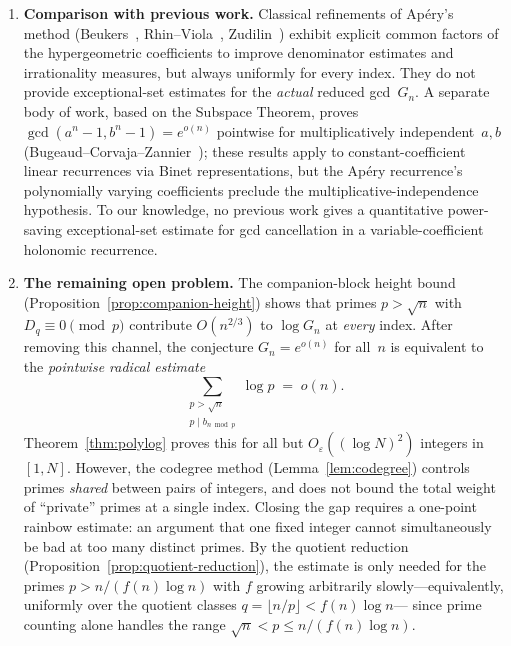 \documentclass[11pt]{article}
\theoremstyle{definition}
\theoremstyle{remark}
\begin{document}
\begin{enumerate}
\item \textbf{Comparison with previous work.}\label{rem:literature}
      Classical refinements of Ap\'ery's method
      (Beukers~\cite{Beukers1985},
      Rhin--Viola~\cite{RhinViola2001},
      Zudilin~\cite{Zudilin2004})
      exhibit explicit common factors
      of the hypergeometric coefficients
      to improve denominator estimates
      and irrationality measures,
      but always uniformly for every index.
      They do not provide exceptional-set
      estimates for the \emph{actual}
      reduced gcd~$G_n$.
      A separate body of work, based on the
      Subspace Theorem, proves
      $\gcd(a^n - 1, b^n - 1) = e^{o(n)}$
      pointwise for multiplicatively
      independent~$a, b$
      (Bugeaud--Corvaja--Zannier~\cite{BCZ2003});
      these results apply to constant-coefficient
      linear recurrences via Binet representations,
      but the Ap\'ery recurrence's
      polynomially varying coefficients
      preclude the multiplicative-independence
      hypothesis.
      To our knowledge, no previous work gives
      a quantitative power-saving exceptional-set
      estimate for gcd cancellation
      in a variable-coefficient
      holonomic recurrence.

\item \textbf{The remaining open problem.}\label{rem:rainbow-open}
      The companion-block height bound
      (Proposition~\ref{prop:companion-height})
      shows that primes $p > \sqrt{n}$ with
      $D_q \equiv 0 \pmod{p}$
      contribute $O(n^{2/3})$ to $\log G_n$
      at \emph{every} index.
      After removing this channel, the conjecture
      $G_n = e^{o(n)}$ for all~$n$ is equivalent
      to the \emph{pointwise radical estimate}
      \[
        \sum_{\substack{p > \sqrt{n} \\
          p \mid b_{n \bmod p}}}
        \log p \;=\; o(n).
      \]
      Theorem~\ref{thm:polylog} proves this for all
      but $O_\varepsilon((\log N)^2)$ integers in~$[1, N]$.
      However, the codegree method
      (Lemma~\ref{lem:codegree}) controls
      primes \emph{shared} between pairs of integers,
      and does not bound the total weight of
      ``private'' primes at a single index.
      Closing the gap requires a
      one-point rainbow estimate:
      an argument that one fixed integer cannot
      simultaneously be bad at too many
      distinct primes.
      By the quotient reduction
      (Proposition~\ref{prop:quotient-reduction}),
      the estimate is only needed for the primes
      $p > n/(f(n)\log n)$ with $f$ growing
      arbitrarily slowly---equivalently, uniformly
      over the quotient classes
      $q = \lfloor n/p \rfloor < f(n)\log n$---%
      since prime counting alone handles
      the range $\sqrt{n} < p \le n/(f(n)\log n)$.
\end{enumerate}
\end{document}
